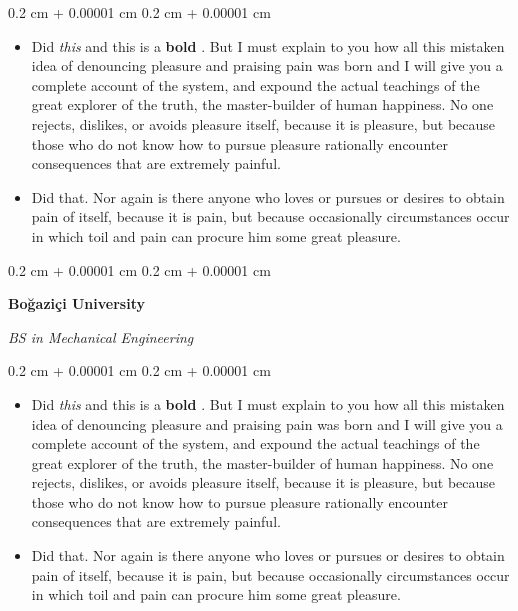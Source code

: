 \documentclass[10pt, letterpaper]{article}
\newenvironment{highlights}{
    \begin{itemize}[
        topsep=0.10 cm,
        parsep=0.10 cm,
        partopsep=0pt,
        itemsep=0pt,
        leftmargin=0.4 cm + 10pt
    ]
}{
    \end{itemize}
} %
\newenvironment{onecolentry}{
    \begin{adjustwidth}{
        0.2 cm + 0.00001 cm
    }{
        0.2 cm + 0.00001 cm
    }
}{
    \end{adjustwidth}
} %
\let\hrefWithoutArrow\href
\renewcommand{\href}[2]{\hrefWithoutArrow{#1}{\ifthenelse{\equal{#2}{}}{ }{#2 }\raisebox{.15ex}{\footnotesize \faExternalLink*}}}
\begin{document}
        \vspace{0.10 cm}
        \begin{onecolentry}
            \begin{highlights}
                \item Did \textit{this} and this is a \textbf{bold} \href{https://example.com}{link}. But I must explain to you how all this mistaken idea of denouncing pleasure and praising pain was born and I will give you a complete account of the system, and expound the actual teachings of the great explorer of the truth, the master-builder of human happiness. No one rejects, dislikes, or avoids pleasure itself, because it is pleasure, but because those who do not know how to pursue pleasure rationally encounter consequences that are extremely painful.
                \item Did that. Nor again is there anyone who loves or pursues or desires to obtain pain of itself, because it is pain, but because occasionally circumstances occur in which toil and pain can procure him some great pleasure.
            \end{highlights}
        \end{onecolentry}


        \vspace{0.2 cm}

        \begin{onecolentry}
            \textbf{Boğaziçi University}

            \textit{BS in Mechanical Engineering}
        \end{onecolentry}

        \vspace{0.10 cm}
        \begin{onecolentry}
            \begin{highlights}
                \item Did \textit{this} and this is a \textbf{bold} \href{https://example.com}{link}. But I must explain to you how all this mistaken idea of denouncing pleasure and praising pain was born and I will give you a complete account of the system, and expound the actual teachings of the great explorer of the truth, the master-builder of human happiness. No one rejects, dislikes, or avoids pleasure itself, because it is pleasure, but because those who do not know how to pursue pleasure rationally encounter consequences that are extremely painful.
                \item Did that. Nor again is there anyone who loves or pursues or desires to obtain pain of itself, because it is pain, but because occasionally circumstances occur in which toil and pain can procure him some great pleasure.
            \end{highlights}
        \end{onecolentry}
\end{document}
